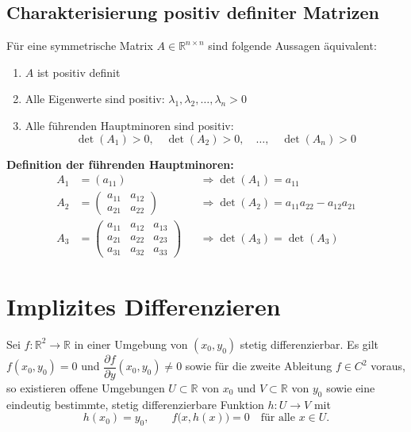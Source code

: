 \documentclass[a4paper,11pt,oneside,open=any,parskip=half, DIV=15]{scrreprt}
\begin{document}
   \subsection*{Charakterisierung positiv definiter Matrizen}
      Für eine symmetrische Matrix \(A \in \mathbb{R}^{n \times n}\) sind folgende Aussagen äquivalent:
      \begin{enumerate}
         \item \(A\) ist positiv definit
         \item Alle Eigenwerte sind positiv: \(\lambda_1, \lambda_2, \ldots, \lambda_n > 0\)
         \item Alle führenden Hauptminoren sind positiv:
         \[
            \det(A_1) > 0, \quad \det(A_2) > 0, \quad \ldots, \quad \det(A_n) > 0
         \]
      \end{enumerate}

      \textbf{Definition der führenden Hauptminoren:}
         \begin{align*}
            A_1 &= (a_{11}) &&\Rightarrow \det(A_1) = a_{11}\\
            A_2 &= \begin{pmatrix} a_{11} & a_{12} \\ a_{21} & a_{22} \end{pmatrix} &&\Rightarrow \det(A_2) = a_{11}a_{22} - a_{12}a_{21}\\
            A_3 &= \begin{pmatrix} a_{11} & a_{12} & a_{13} \\ a_{21} & a_{22} & a_{23} \\ a_{31} & a_{32} & a_{33} \end{pmatrix} &&\Rightarrow \det(A_3) = \det(A_3)
         \end{align*}

\section{Implizites Differenzieren}

   Sei \(f:\mathbb{R}^2\to\mathbb{R}\) in einer Umgebung von \((x_0,y_0)\) stetig differenzierbar.
   Es gilt \(f(x_0,y_0)=0\) und \(\dfrac{\partial f}{\partial y}(x_0,y_0)\neq 0\) sowie für die zweite Ableitung \(f\in C^2\) voraus, so existieren offene Umgebungen \(U\subset\mathbb{R}\) von \(x_0\) und \(V\subset\mathbb{R}\) von \(y_0\) sowie eine eindeutig
   bestimmte, stetig differenzierbare Funktion \(h:U\to V\) mit
   \[
      h(x_0)=y_0,\qquad f\bigl(x,h(x)\bigr)=0\quad\text{für alle }x\in U.
   \]
\end{document}
